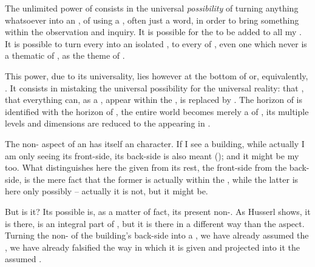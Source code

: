 \pa The unlimited power of  consists in the universal {\em
  possibility} of turning anything whatsoever into an , of using a
, often just a word, in order to bring something within the  observation and inquiry. It is possible for the  to be added to all my . It is possible to turn every  into an isolated
, to  every  of , even 
  one which never is a thematic  of , as the
   theme of . 

This power, due to its universality, lies however at the bottom of
 or, equivalently, .  It consists in mistaking the universal
possibility for the universal reality: that , that everything can, as a , appear within the \hoa, is
replaced by . The horizon of
 is identified with the horizon of , the entire
world becomes merely a  of , its multiple levels and
dimensions are reduced to the  appearing in . 


\pa
The non- aspect of an  has itself an 
 character. If I see a building, while actually I am only 
seeing its front-side, its back-side is also meant (); and it might be my 
 too. What distinguishes here the given  from its rest, the 
front-side from the back-side, is the mere fact that the former is 
actually within the \hoa, while the latter is here only possibly -- 
actually it is not, but it might be. 

But is it? Its possible  is, as a matter of fact, its 
present non-. As Husserl shows, it is there, is an 
integral part of , but it is there in a different 
way than the  aspect. Turning the non- of 
the building's back-side into a , we have already 
assumed the , we have already falsified 
the way in which it is given and projected into it the assumed 
. 

